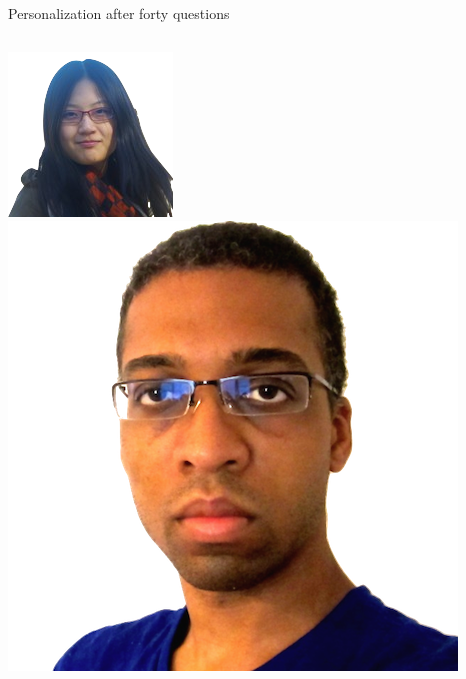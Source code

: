\documentclass[compress]{beamer}
\newcommand{\fsi}[2]{
\begin{frame}[plain]
\vspace*{-1pt}
\makebox[\linewidth]{\texttt{[image: \#1]}}
\begin{center}
#2
\end{center}
\end{frame}
}
\begin{document}
\fsi{qb/augment/bandit_result}{Personalization after forty questions}

\begin{frame}{}
  \begin{columns}
    \begin{center}
        \includegraphics[width=0.8\linewidth]{general_figures/hehe} \\
        \includegraphics[width=0.8\linewidth]{general_figures/alvin}
        \\

\end{center}
\end{columns}
\end{frame}
\end{document}
